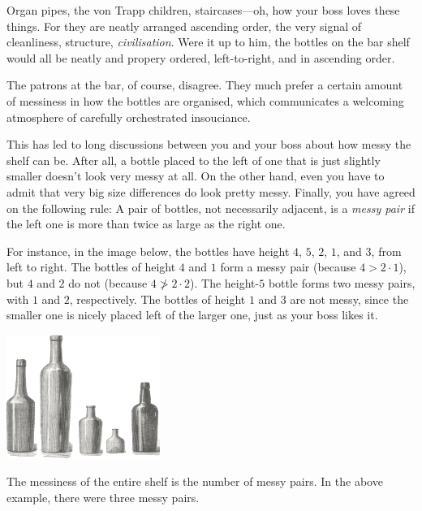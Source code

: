 

Organ pipes, the von Trapp children, staircases---oh, how your boss loves these things.
For they are neatly arranged ascending order, the very signal of cleanliness, structure, \emph{civilisation}.
Were it up to him, the bottles on the bar shelf would all be neatly and propery ordered, left-to-right, and in ascending order.

The patrons at the bar, of course, disagree.
They much prefer a certain amount of messiness in how the bottles are organised, which communicates a welcoming atmosphere of carefully orchestrated insouciance. 

This has led to long discussions between you and your boss about how messy the shelf can be.
After all, a bottle placed to the left of one that is just slightly smaller doesn't look very messy at all.
On the other hand, even you have to admit that very big size differences do look pretty messy.
Finally, you have agreed on the following rule:
A pair of bottles, not necessarily adjacent, is a \emph{messy pair} if the left one is more than twice as large as the right one.

\medskip
For instance, in the image below, the bottles have height $4$, $5$, $2$, $1$, and $3$, from left to right.
The bottles of height $4$ and $1$ form a messy pair (because $4 > 2\cdot 1$), but $4$ and $2$ do not (because $4\not> 2\cdot 2$).
The height-$5$ bottle forms two messy pairs, with $1$ and $2$, respectively.
The bottles of height $1$ and $3$ are not messy, since the smaller one is nicely placed left of the larger one, just as your boss likes it.

\medskip
\includegraphics[width = 5cm]{img/messy_bottles.png}

The messiness of the entire shelf is the number of messy pairs.
In the above example, there were three messy pairs.


